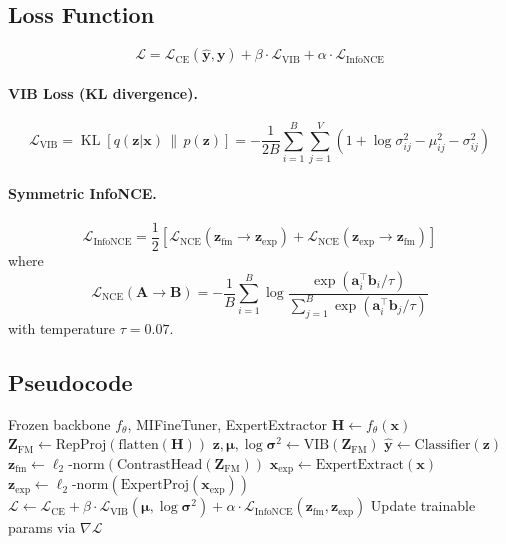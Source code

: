 \documentclass{article}
\DeclareMathOperator{\KL}{KL}
\newcommand{\mL}{\mathcal{L}}
\newcommand{\bx}{\bm{x}}
\newcommand{\bz}{\bm{z}}
\newcommand{\bmu}{\bm{\mu}}
\newcommand{\bsigma}{\bm{\sigma}}
\begin{document}
\subsection{Loss Function}

\begin{equation}
\mL = \mL_\text{CE}(\hat{\bm{y}}, \bm{y}) + \beta \cdot \mL_\text{VIB} + \alpha \cdot \mL_\text{InfoNCE}
\end{equation}

\paragraph{VIB Loss (KL divergence).}
\begin{equation}
\mL_\text{VIB} = \KL\!\left[q(\bz|\bx) \,\|\, p(\bz)\right] = -\frac{1}{2B} \sum_{i=1}^{B} \sum_{j=1}^{V} \left(1 + \log\sigma^2_{ij} - \mu^2_{ij} - \sigma^2_{ij}\right)
\end{equation}

\paragraph{Symmetric InfoNCE.}
\begin{equation}
\mL_\text{InfoNCE} = \frac{1}{2}\!\left[\mL_\text{NCE}(\bz_\text{fm} \to \bz_\text{exp}) + \mL_\text{NCE}(\bz_\text{exp} \to \bz_\text{fm})\right]
\end{equation}
where
\begin{equation}
\mL_\text{NCE}(\bm{A} \to \bm{B}) = -\frac{1}{B} \sum_{i=1}^{B} \log \frac{\exp(\bm{a}_i^\top \bm{b}_i / \tau)}{\sum_{j=1}^{B} \exp(\bm{a}_i^\top \bm{b}_j / \tau)}
\end{equation}
with temperature $\tau = 0.07$.

\subsection{Pseudocode}

\begin{algorithm}[H]
\caption{MI Fine-Tuning (VIB + InfoNCE)}
\begin{algorithmic}[1]
\REQUIRE Frozen backbone $f_\theta$, MIFineTuner, ExpertExtractor
\FOR{each mini-batch $(\bx, \bm{y})$}
  \STATE $\bm{H} \leftarrow f_\theta(\bx)$ 
  \STATE $\bm{Z}_\text{FM} \leftarrow \text{RepProj}(\text{flatten}(\bm{H}))$
  \STATE $\bz, \bmu, \log\bsigma^2 \leftarrow \text{VIB}(\bm{Z}_\text{FM})$ 
  \STATE $\hat{\bm{y}} \leftarrow \text{Classifier}(\bz)$
  \STATE $\bz_\text{fm} \leftarrow \ell_2\text{-norm}(\text{ContrastHead}(\bm{Z}_\text{FM}))$
  \STATE $\bm{x}_\text{exp} \leftarrow \text{ExpertExtract}(\bx)$ 
  \STATE $\bz_\text{exp} \leftarrow \ell_2\text{-norm}(\text{ExpertProj}(\bm{x}_\text{exp}))$
  \STATE $\mL \leftarrow \mL_\text{CE} + \beta \cdot \mL_\text{VIB}(\bmu, \log\bsigma^2) + \alpha \cdot \mL_\text{InfoNCE}(\bz_\text{fm}, \bz_\text{exp})$
  \STATE Update trainable params via $\nabla \mL$
\ENDFOR
\end{algorithmic}
\end{algorithm}
\end{document}
